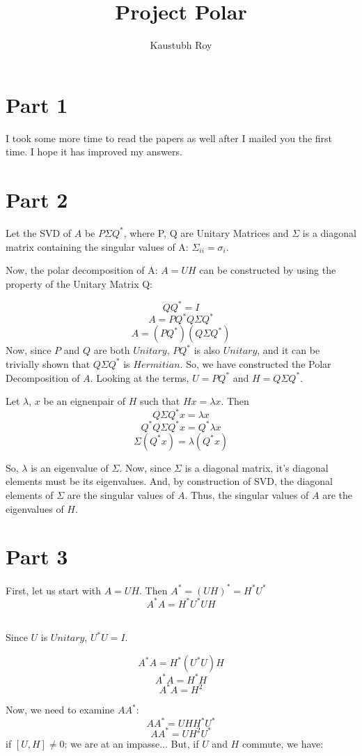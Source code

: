 \documentclass{article}
\title{Project Polar}
\author{Kaustubh Roy}
\begin{document}
\maketitle

\section{Part 1}
I took some more time to read the papers as well after I mailed you the first time. I hope it has improved my answers.

\section{Part 2}

Let the SVD of $A$ be $P\Sigma Q^*$, where P, Q are Unitary Matrices and $\Sigma$ is a diagonal matrix containing the singular values of A: $\Sigma_{ii} = \sigma_{i}$. 

Now, the polar decomposition of A: $A = UH$ can be constructed by using the property of the Unitary Matrix Q:

\[QQ^* = I\]
\[A = P Q^* Q \Sigma Q^*\]
\[A = (P Q^*) (Q \Sigma Q^*)\]
Now, since $P$ and $Q$ are both $Unitary$, $P Q^*$ is also $Unitary$, and it can be trivially shown that $Q \Sigma Q^*$ is $Hermitian$. So, we have constructed the Polar Decomposition of $A$.
Looking at the terms, $U = PQ^*$ and $H=Q \Sigma Q^*$.

Let $\lambda$, $x$ be an eignenpair of $H$ such that $Hx=\lambda x$. Then
\[ Q \Sigma Q^* x = \lambda x\]
\[ Q^* Q \Sigma Q^* x = Q^* \lambda x\]
\[\Sigma (Q^* x) = \lambda (Q^* x)\]

So, $\lambda$ is an eigenvalue of $\Sigma$. Now, since $\Sigma $ is a diagonal matrix, it's diagonal elements must be its eigenvalues. And, by construction of SVD, the diagonal elements of $\Sigma$ are the singular values of $A$. Thus, the singular values of $A$ are the eigenvalues of $H$.

\newpage
\section{Part 3}

First, let us start with $A = UH$. Then $A^* = (UH)^* = H^* U^*$
\[ A^* A = H^* U^* U H \]\

Since $U$ is $Unitary$, $U^* U = I$.

\[ A^* A = H^* (U^* U) H\]
\[ A^* A = H^* H\]
\[ A^* A = H^2\]

Now, we need to examine $A A^*$:
\[A A^* = U H H^* U^*\]
\[A A^* = U H^2 U^*\]
if $[U, H] \ne 0$: we are at an impasse...
But, if $U$ and $H$ commute, we have:
\end{document}

